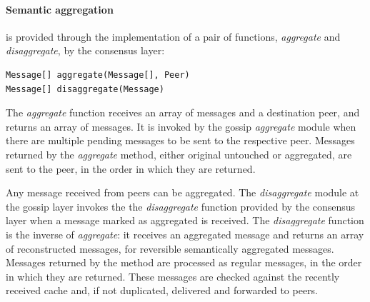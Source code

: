 \paragraph{Semantic aggregation} is provided through the implementation of a pair of
functions, {\em aggregate} and {\em disaggregate}, by the consensus layer:

\begin{verbatim}
Message[] aggregate(Message[], Peer)
Message[] disaggregate(Message)
\end{verbatim}

The {\em aggregate} function receives an array of messages and a destination
peer, and returns an array of messages.
It is invoked by the gossip {\em aggregate} module when there are multiple pending messages to be sent to the respective peer.
%
%
Messages returned by the {\em aggregate} method, either original untouched or 
aggregated, are sent to the peer, in the order in which they are returned.

Any message received from peers can be aggregated.  
The {\em disaggregate} module at the gossip layer invokes the 
the {\em disaggregate} function provided by the consensus layer when a message marked as
aggregated is received.
The {\em disaggregate} function 
is the inverse of {\em aggregate}: it receives an aggregated message and returns an array of reconstructed messages, for reversible semantically aggregated
messages.
Messages returned by the method are processed as regular messages, in the order
in which they are returned.
These messages are checked against the recently received
cache and, if not duplicated, delivered and forwarded to peers.


